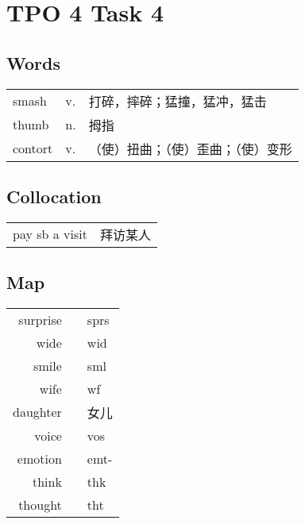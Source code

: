 \section{TPO 4 Task 4}

\subsection{Words}

\begin{tabular}{lll}
    smash   & v. & 打碎，摔碎；猛撞，猛冲，猛击    \\
    thumb   & n. & 拇指                \\
    contort & v. & （使）扭曲；（使）歪曲；（使）变形 \\
\end{tabular}

\subsection{Collocation}

\begin{tabular}{ll}
    pay sb a visit & 拜访某人 \\
\end{tabular}

\subsection{Map}

\begin{tabular}{rc@{\quad$\to$\quad}l}
    surprise &  & sprs \\
    wide     &  & wid  \\
    smile    &  & sml  \\
    wife     &  & wf   \\
    daughter &  & 女儿   \\
    voice    &  & vos  \\
    emotion  &  & emt- \\
    think    &  & thk  \\
    thought  &  & tht  \\
\end{tabular}
